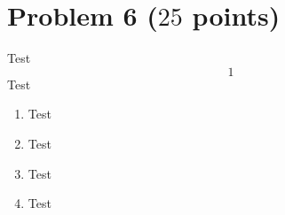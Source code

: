 \documentclass[a4paper]{article}%
\begin{document}
\clearpage %

\clearpage %

\clearpage
{}\clearpage %







\section*{Problem 6 ($25$ points)} 
Test
\begin{equation*}
  1
\end{equation*}
Test

\begin{enumerate}[label=(\alph*)]
  \item 
  Test
  \item
  Test
  \item 
  Test
  \item 
  Test
\end{enumerate}

\clearpage %

\clearpage %

\clearpage
{}\clearpage %
\end{document}
